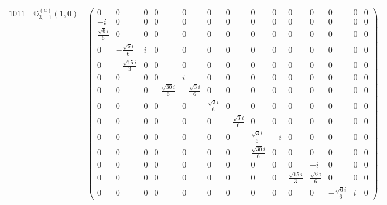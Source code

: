 \documentclass[fleqn,8pt,landscape]{jsarticle}
\begin{document}
\begin{center}
\begin{longtable}{ccc}
$ 1011 $ & $ \mathbb{G}_{3,-1}^{(a)}(1,0) $ & $ \begin{pmatrix} 0 & 0 & 0 & 0 & 0 & 0 & 0 & 0 & 0 & 0 & 0 & 0 & 0 & 0 \\ - i & 0 & 0 & 0 & 0 & 0 & 0 & 0 & 0 & 0 & 0 & 0 & 0 & 0 \\ \frac{\sqrt{6} i}{6} & 0 & 0 & 0 & 0 & 0 & 0 & 0 & 0 & 0 & 0 & 0 & 0 & 0 \\ 0 & - \frac{\sqrt{6} i}{6} & i & 0 & 0 & 0 & 0 & 0 & 0 & 0 & 0 & 0 & 0 & 0 \\ 0 & - \frac{\sqrt{15} i}{3} & 0 & 0 & 0 & 0 & 0 & 0 & 0 & 0 & 0 & 0 & 0 & 0 \\ 0 & 0 & 0 & 0 & i & 0 & 0 & 0 & 0 & 0 & 0 & 0 & 0 & 0 \\ 0 & 0 & 0 & - \frac{\sqrt{30} i}{6} & - \frac{\sqrt{3} i}{6} & 0 & 0 & 0 & 0 & 0 & 0 & 0 & 0 & 0 \\ 0 & 0 & 0 & 0 & 0 & \frac{\sqrt{3} i}{6} & 0 & 0 & 0 & 0 & 0 & 0 & 0 & 0 \\ 0 & 0 & 0 & 0 & 0 & 0 & - \frac{\sqrt{3} i}{6} & 0 & 0 & 0 & 0 & 0 & 0 & 0 \\ 0 & 0 & 0 & 0 & 0 & 0 & 0 & \frac{\sqrt{3} i}{6} & - i & 0 & 0 & 0 & 0 & 0 \\ 0 & 0 & 0 & 0 & 0 & 0 & 0 & \frac{\sqrt{30} i}{6} & 0 & 0 & 0 & 0 & 0 & 0 \\ 0 & 0 & 0 & 0 & 0 & 0 & 0 & 0 & 0 & 0 & - i & 0 & 0 & 0 \\ 0 & 0 & 0 & 0 & 0 & 0 & 0 & 0 & 0 & \frac{\sqrt{15} i}{3} & \frac{\sqrt{6} i}{6} & 0 & 0 & 0 \\ 0 & 0 & 0 & 0 & 0 & 0 & 0 & 0 & 0 & 0 & 0 & - \frac{\sqrt{6} i}{6} & i & 0 \end{pmatrix} $ \\ \hline

\end{longtable}
\end{center}
\end{document}
